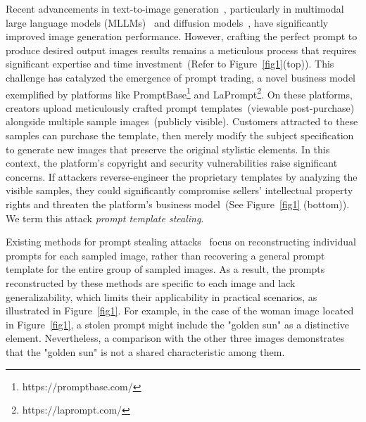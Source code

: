 Recent advancements in text-to-image generation~\citep{liu2024visual,cao2024controllable}, particularly in multimodal large language models (MLLMs)~\citep{liu2024visual,wang2024qwen2} and diffusion models~\citep{ho2020denoising,sohl2015deep}, have significantly improved image generation performance. 
However, crafting the perfect prompt to produce desired output images results remains a meticulous process that requires significant expertise and time investment~(Refer to Figure~\ref{fig1}(top)).
This challenge has catalyzed the emergence of prompt trading, a novel business model exemplified by platforms like PromptBase\footnote{https://promptbase.com/} and LaPrompt\footnote{https://laprompt.com/}. On these platforms, creators upload meticulously crafted prompt templates~(viewable post-purchase) alongside multiple sample images~(publicly visible). Customers attracted to these samples can purchase the template, then merely modify the subject specification to generate new images that preserve the original stylistic elements.
In this context, the platform’s copyright and security vulnerabilities raise significant concerns. If attackers reverse-engineer the proprietary templates by analyzing the visible samples, they could significantly compromise sellers' intellectual property rights and threaten the platform's business model~(See Figure~\ref{fig1} (bottom)). We term this attack \textit{prompt template stealing}.


Existing methods for prompt stealing attacks~\citep{shen2024prompt,sha2024prompt,naseh2024iteratively} focus on reconstructing individual prompts for each sampled image, rather than recovering a general prompt template for the entire group of sampled images. As a result, the prompts reconstructed by these methods are specific to each image and lack generalizability, which limits their applicability in practical scenarios, as illustrated in Figure~\ref{fig1}. For example, in the case of the woman image located in Figure~\ref{fig1}, a stolen prompt might include the "golden sun" as a distinctive element. Nevertheless, a comparison with the other three images demonstrates that the "golden sun" is not a shared characteristic among them.

